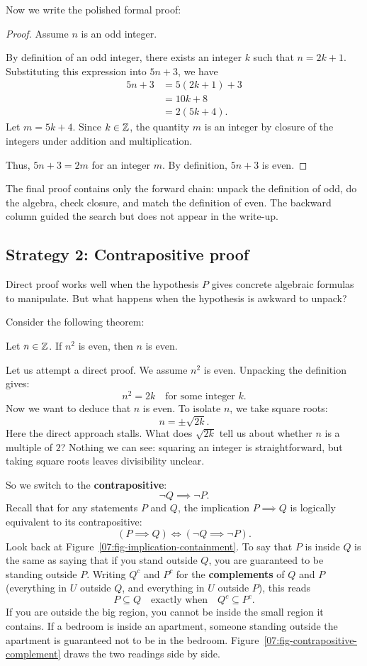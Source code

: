 Now we write the polished formal proof:

\begin{proof}
Assume $n$ is an odd integer.

By definition of an odd integer, there exists an integer $k$ such that $n = 2k + 1$. Substituting this expression into $5n + 3$, we have
\begin{align*}
5n + 3 &= 5(2k + 1) + 3\\
&= 10k + 8\\
&= 2(5k + 4).
\end{align*}
Let $m = 5k + 4$. Since $k \in \mathbb{Z}$, the quantity $m$ is an integer by closure of the integers under addition and multiplication. 

Thus, $5n + 3 = 2m$ for an integer $m$. By definition, $5n + 3$ is even.
\end{proof}

The final proof contains only the forward chain: unpack the definition of odd, do the algebra, check closure, and match the definition of even. The backward column guided the search but does not appear in the write-up.

\subsection{Strategy 2: Contrapositive proof}

Direct proof works well when the hypothesis $P$ gives concrete algebraic formulas to manipulate. But what happens when the hypothesis is awkward to unpack?

Consider the following theorem:
\begin{theorem}
Let $n \in \mathbb{Z}$. If $n^2$ is even, then $n$ is even.
\end{theorem}

Let us attempt a direct proof. We assume $n^2$ is even. Unpacking the definition gives:
\[
n^2 = 2k \quad \text{for some integer } k.
\]
Now we want to deduce that $n$ is even. To isolate $n$, we take square roots:
\[
n = \pm\sqrt{2k}.
\]
Here the direct approach stalls. What does $\sqrt{2k}$ tell us about whether $n$ is a multiple of $2$? Nothing we can see: squaring an integer is straightforward, but taking square roots leaves divisibility unclear.

So we switch to the \textbf{contrapositive}:
\[
\neg Q \implies \neg P.
\]
Recall that for any statements $P$ and $Q$, the implication $P \implies Q$ is logically equivalent to its contrapositive:
\[
(P \implies Q) \iff (\neg Q \implies \neg P).
\]
Look back at Figure~\ref{07:fig-implication-containment}. To say that $P$ is inside $Q$ is the same as saying that if you stand outside $Q$, you are guaranteed to be standing outside $P$. Writing $Q^c$ and $P^c$ for the \textbf{complements} of $Q$ and $P$ (everything in $U$ outside $Q$, and everything in $U$ outside $P$), this reads
\[
P \subseteq Q \quad \text{exactly when} \quad Q^c \subseteq P^c.
\]
If you are outside the big region, you cannot be inside the small region it contains. If a bedroom is inside an apartment, someone standing outside the apartment is guaranteed not to be in the bedroom. Figure~\ref{07:fig-contrapositive-complement} draws the two readings side by side.

